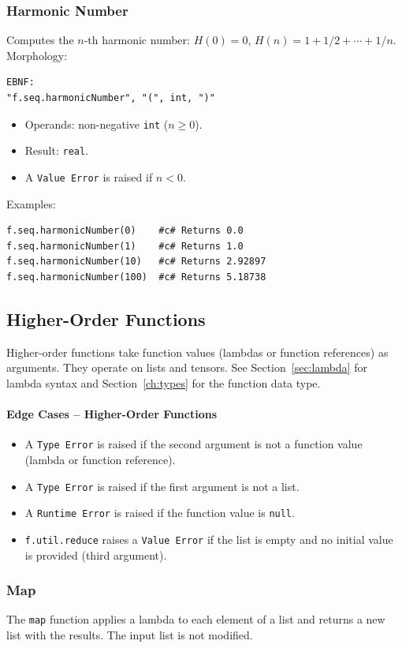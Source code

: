 \subsubsection{Harmonic Number}
Computes the $n$-th harmonic number: $H(0) = 0$, $H(n) = 1 + 1/2 + \cdots + 1/n$.\\
Morphology:
\begin{verbatim}
EBNF:
"f.seq.harmonicNumber", "(", int, ")"
\end{verbatim}
\begin{itemize}
\item Operands: non-negative \texttt{int} ($n \geq 0$).
\item Result: \texttt{real}.
\item A \texttt{Value Error} is raised if $n < 0$.
\end{itemize}
Examples:
\begin{verbatim}
f.seq.harmonicNumber(0)    #c# Returns 0.0
f.seq.harmonicNumber(1)    #c# Returns 1.0
f.seq.harmonicNumber(10)   #c# Returns 2.92897
f.seq.harmonicNumber(100)  #c# Returns 5.18738
\end{verbatim}


\subsection{Higher-Order Functions}
Higher-order functions take function values (lambdas or function references) as arguments. They operate on lists and tensors. See Section~\ref{sec:lambda} for lambda syntax and Section~\ref{ch:types} for the function data type.

\paragraph{Edge Cases -- Higher-Order Functions}
\begin{itemize}
\item A \texttt{Type Error} is raised if the second argument is not a function value (lambda or function reference).
\item A \texttt{Type Error} is raised if the first argument is not a list.
\item A \texttt{Runtime Error} is raised if the function value is \texttt{null}.
\item \texttt{f.util.reduce} raises a \texttt{Value Error} if the list is empty and no initial value is provided (third argument).
\end{itemize}

\subsubsection{Map}
The \texttt{map} function applies a lambda to each element of a list and returns a new list with the results. The input list is not modified.

